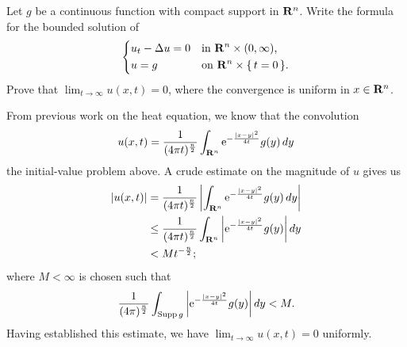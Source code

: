 \begin{problem}
  Let \(g\) be a continuous function with compact support in
  \(\mathbf{R}^n\). Write the formula for the bounded solution of
  \[
    \left\{
      \begin{aligned}
        &u_t-\Delta u=0&&\text{in \(\mathbf{R}^n\times(0,\infty)\),}\\
        &u=g&&\text{on \(\mathbf{R}^n\times\{\,t=0\,\}\).}
      \end{aligned}
    \right.
  \]
  Prove that \(\lim_{t\to\infty} u(x,t)=0\), where the convergence is
  uniform in \(x\in\mathbf{R}^n\).
\end{problem}
\begin{solution*}
  From previous work on the heat equation, we know that the convolution
  \[
    u(x,t)
    =\frac{1}{(4\pi t)^{\frac{n}{2}}}%
    \int_{\R^n}\rme^{-\frac{|x-y|^2}{4t}}g(y)\diff y
  \]
  the initial-value problem above. A crude estimate on the magnitude of
  \(u\) gives us
  \begin{align*}
    |u(x,t)|
    &=%
      \frac{1}{(4\pi t)^{\frac{n}{2}}}%
      \left|
      \int_{\R^n}\rme^{-\frac{|x-y|^2}{4t}}g(y)\diff y
      \right|\\
    &\leq%
      \frac{1}{(4\pi t)^{\frac{n}{2}}}
      \int_{\R^n}\left|\rme^{-\frac{|x-y|^2}{4t}}g(y)\right|\diff y\\
    &<M t^{-\frac{n}{2}};
  \end{align*}
  where \(M<\infty\) is chosen such that
  \[
    \frac{1}{(4\pi)^{\frac{n}{2}}}
    \int_{\operatorname{Supp} g}\left|\mathrm{e}^{-\frac{|x-y|^2}{4t}}g(y)\right|\mathop{}\!d y
    <M.
  \]
  Having established this estimate, we have \(\lim_{t\to\infty}u(x,t)=0\)
  uniformly.
\end{solution*}

